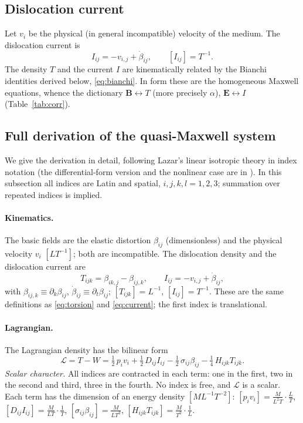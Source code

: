 \documentclass[12pt,a4paper]{article}
\begin{document}
\subsection{Dislocation current}
Let $v_i$ be the physical (in general incompatible) velocity of the medium. The
dislocation current is \cite[eq.~(1)]{lazar2010pla}
\begin{equation}
I_{ij}=-v_{i,j}+\dot\beta_{ij},\qquad [I_{ij}]=T^{-1}.
\label{eq:current}
\end{equation}
The density $T$ and the current $I$ are kinematically related by the Bianchi
identities derived below, \eqref{eq:bianchi}. In form these are the homogeneous
Maxwell equations, whence the dictionary $\mathbf B\leftrightarrow T$ (more precisely
$\alpha$), $\mathbf E\leftrightarrow I$ (Table~\ref{tab:corr}).

\subsection{Full derivation of the quasi-Maxwell system}
We give the derivation in detail, following Lazar's linear isotropic theory in
index notation \cite{lazar2010pla} (the differential-form version and the nonlinear
case are in \cite{lazar2010}). In this subsection all indices are Latin and spatial,
$i,j,k,l=1,2,3$; summation over repeated indices is implied.

\paragraph{Kinematics.} The basic fields are the elastic distortion $\beta_{ij}$
(dimensionless) and the physical velocity $v_i$ $[LT^{-1}]$; both are incompatible.
The dislocation density and the dislocation current are \cite[eq.~(1)]{lazar2010pla}
\begin{equation}
T_{ijk}=\beta_{ik,j}-\beta_{ij,k},\qquad I_{ij}=-v_{i,j}+\dot\beta_{ij},
\label{eq:TI_lazar}
\end{equation}
with $\beta_{ij,k}\equiv\partial_k\beta_{ij}$, $\dot\beta_{ij}\equiv\partial_t\beta_{ij}$;
$[T_{ijk}]=L^{-1}$, $[I_{ij}]=T^{-1}$. These are the same definitions as \eqref{eq:torsion} and \eqref{eq:current}; the
first index is translational.

\paragraph{Lagrangian.} The Lagrangian density has the bilinear form
\cite[eq.~(3)]{lazar2010pla}
\begin{equation}
\mathcal{L}=T-W=\tfrac12\,p_iv_i+\tfrac12\,D_{ij}I_{ij}-\tfrac12\,\sigma_{ij}\beta_{ij}
-\tfrac14\,H_{ijk}T_{ijk}.
\label{eq:lagr}
\end{equation}
\textit{Scalar character.} All indices are contracted in each term: one in the first,
two in the second and third, three in the fourth. No index is free, and $\mathcal L$ is
a scalar. Each term has the dimension of an energy density $[ML^{-1}T^{-2}]$:
$[p_iv_i]=\frac{M}{L^2T}\cdot\frac LT$, $[D_{ij}I_{ij}]=\frac M{LT}\cdot\frac1T$,
$[\sigma_{ij}\beta_{ij}]=\frac M{LT^2}$, $[H_{ijk}T_{ijk}]=\frac M{T^2}\cdot\frac1L$.
\end{document}
